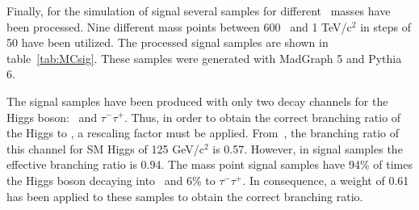 Finally, for the simulation of signal several samples for different \Tp~masses have been processed. Nine different mass points between 600 \GeVcc~and 1 TeV/$\text{c}^{2}$ in steps of 50 \GeVcc have been utilized. The processed signal samples are shown in table~\ref{tab:MCsig}. These samples were generated with MadGraph 5 and Pythia 6.

\begin{table*}[htbH]
\begin{center}
\caption{List of Monte-Carlo signal samples used in the analysis, their corresponding cross-section and \Tp~mass.\label{tab:MCsig}}
\end{center}
\end{table*}

The signal samples have been produced with only two decay channels for the Higgs boson: \bbbar~and $\tau^{-}\tau^{+}$. Thus, in order to obtain the correct branching ratio of the Higgs to \bbbar, a rescaling factor must be applied. From~\cite{Heinemeyer:2013tqa}, the branching ratio of this channel for SM Higgs of 125 GeV/$\text{c}^{2}$ is 0.57. However, in signal samples the effective branching ratio is 0.94. The mass point signal samples have 94\% of times the Higgs boson decaying into \bbbar~and 6\% to $\tau^{-}\tau^{+}$. In consequence, a weight of 0.61 has been applied to these samples to obtain the correct branching ratio. %

